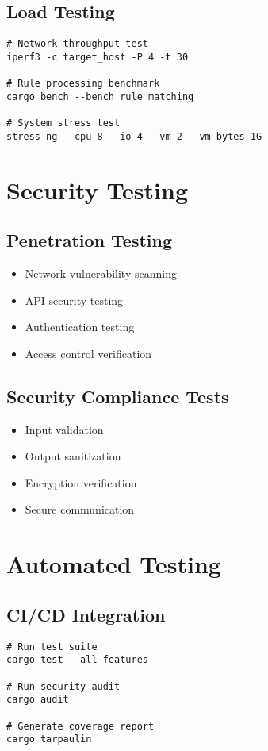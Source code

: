 \documentclass{article}
\begin{document}
\subsection{Load Testing}
\begin{verbatim}
# Network throughput test
iperf3 -c target_host -P 4 -t 30

# Rule processing benchmark
cargo bench --bench rule_matching

# System stress test
stress-ng --cpu 8 --io 4 --vm 2 --vm-bytes 1G
\end{verbatim}

\section{Security Testing}

\subsection{Penetration Testing}
\begin{itemize}
    \item Network vulnerability scanning
    \item API security testing
    \item Authentication testing
    \item Access control verification
\end{itemize}

\subsection{Security Compliance Tests}
\begin{itemize}
    \item Input validation
    \item Output sanitization
    \item Encryption verification
    \item Secure communication
\end{itemize}

\section{Automated Testing}

\subsection{CI/CD Integration}
\begin{verbatim}
# Run test suite
cargo test --all-features

# Run security audit
cargo audit

# Generate coverage report
cargo tarpaulin
\end{verbatim}
\end{document}
